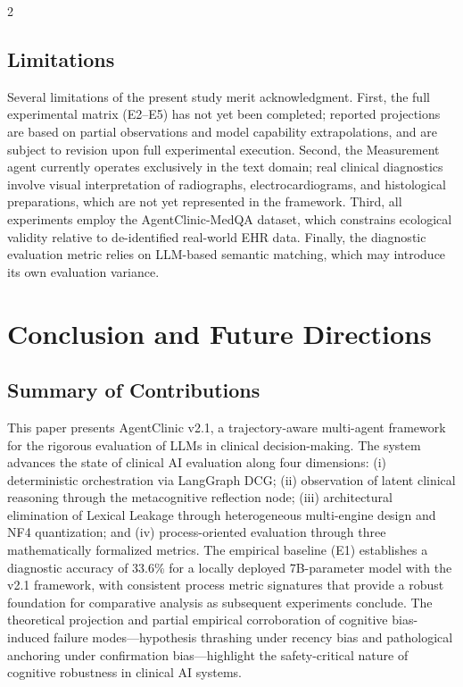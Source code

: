 \documentclass[10pt, a4paper]{article}
\begin{document}
\begin{multicols}{2}
\subsection{Limitations}

Several limitations of the present study merit acknowledgment. First, the full experimental matrix (E2–E5) has not yet been completed; reported projections are based on partial observations and model capability extrapolations, and are subject to revision upon full experimental execution. Second, the Measurement agent currently operates exclusively in the text domain; real clinical diagnostics involve visual interpretation of radiographs, electrocardiograms, and histological preparations, which are not yet represented in the framework. Third, all experiments employ the AgentClinic-MedQA dataset, which constrains ecological validity relative to de-identified real-world EHR data. Finally, the diagnostic evaluation metric relies on LLM-based semantic matching, which may introduce its own evaluation variance.


\section{Conclusion and Future Directions}
\label{sec:conclusion}

\subsection{Summary of Contributions}

This paper presents AgentClinic v2.1, a trajectory-aware multi-agent framework for the rigorous evaluation of LLMs in clinical decision-making. The system advances the state of clinical AI evaluation along four dimensions: (i) deterministic orchestration via LangGraph DCG; (ii) observation of latent clinical reasoning through the metacognitive reflection node; (iii) architectural elimination of Lexical Leakage through heterogeneous multi-engine design and NF4 quantization; and (iv) process-oriented evaluation through three mathematically formalized metrics. The empirical baseline (E1) establishes a diagnostic accuracy of 33.6\% for a locally deployed 7B-parameter model with the v2.1 framework, with consistent process metric signatures that provide a robust foundation for comparative analysis as subsequent experiments conclude. The theoretical projection and partial empirical corroboration of cognitive bias-induced failure modes—hypothesis thrashing under recency bias and pathological anchoring under confirmation bias—highlight the safety-critical nature of cognitive robustness in clinical AI systems.


\end{multicols}
\end{document}
